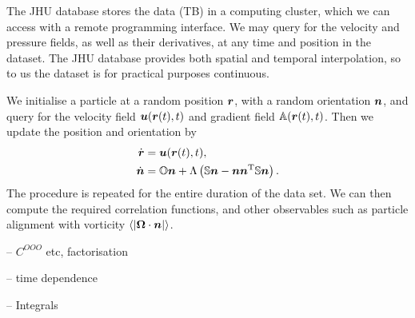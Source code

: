 \documentclass[thesis.tex]{subfiles}
\begin{document}
The JHU database stores the data (\unit[27]{TB}) in a computing cluster, which we can access with a remote programming interface. We may query for the velocity and pressure fields, as well as their derivatives, at any time and position in the dataset. The JHU database provides both spatial and temporal interpolation, so to us the dataset is for practical purposes continuous.

We initialise a particle at a random position $\mbox{\boldmath$r$}$, with a random orientation $\mbox{\boldmath$n$}$, and query for the velocity field $\mbox{\boldmath$u$}(\mbox{\boldmath$r$}(t), t)$ and gradient field $\mathbb{A}(\mbox{\boldmath$r$}(t), t)$. Then we update the position and orientation by
\begin{align*}
	\dot {\mbox{\boldmath$r$}} &= \mbox{\boldmath$u$}(\mbox{\boldmath$r$}(t), t), \\
	\dot {\mbox{\boldmath$n$}} &= \mathbb{O} \mbox{\boldmath$n$} + \Lambda\left(\mathbb{S} \mbox{\boldmath$n$} - \mbox{\boldmath$n$} \mbox{\boldmath$n$}^{\mathrm T} \mathbb{S} \mbox{\boldmath$n$}\right).
\end{align*}
The procedure is repeated for the entire duration of the data set. We can then compute the required correlation functions, and other observables such as particle alignment with vorticity $\langle|\mbox{\boldmath$\Omega$} \cdot \mbox{\boldmath$n$}|\rangle$. 


-- $C^{OOO}$ etc, factorisation

-- time dependence

-- Integrals
\end{document}
